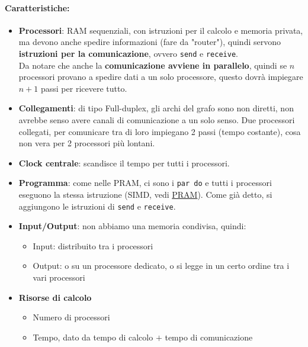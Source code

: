 	\paragraph{Caratteristiche:}
	\begin{itemize}
		\item \textbf{Processori}: RAM sequenziali, con istruzioni per il calcolo e memoria privata, ma devono anche spedire informazioni (fare da "router"), quindi servono \textbf{istruzioni per la comunicazione}, ovvero \texttt{send} e \texttt{receive}.\\
		Da notare che anche la \textbf{comunicazione avviene in parallelo}, quindi se $n$ processori provano a spedire dati a un solo processore, questo dovrà impiegare $n+1$ passi per ricevere tutto.\\
		
		\item \textbf{Collegamenti}: di tipo Full-duplex, gli archi del grafo sono non diretti, non avrebbe senso avere canali di comunicazione a un solo senso. Due processori collegati, per comunicare tra di loro impiegano 2 passi (tempo costante), cosa non vera per 2 processori più lontani.\\
		
		\item \textbf{Clock centrale}: scandisce il tempo per tutti i processori.\\
		
		\item \textbf{Programma}: come nelle PRAM, ci sono i \texttt{par do} e tutti i processori eseguono la stessa istruzione (SIMD, vedi \hyperref[subsubsec:PRAM]{PRAM}). Come già detto, si aggiungono le istruzioni di \texttt{send} e \texttt{receive}.\\
		
		\item \textbf{Input/Output}: non abbiamo una memoria condivisa, quindi: 
		\begin{itemize}
			\item Input: distribuito tra i processori
			\item Output: o su un processore dedicato, o si legge in un certo ordine tra i vari processori
		\end{itemize}
		\nn
		
		\item \textbf{Risorse di calcolo}
		\begin{itemize}
			\item Numero di processori
			\item Tempo, dato da tempo di calcolo $+$ tempo di comunicazione
		\end{itemize}
	\end{itemize}
	
